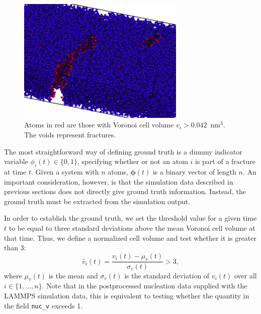     \begin{figure}
    \centering
    \noindent
    \includegraphics[width=8cm, height=6cm]{crack_vol.png}
    \caption{Atoms in red are those with Voronoi cell volume $v_i>0.042$~nm$^3$.  The voids represent fractures.}
    \label{fig:crack_vol}
    \end{figure}



The most straightforward way of defining ground truth is a dummy indicator variable $\phi_i(t) \in\{0,1\}$, specifying whether or not an atom $i$ is part of a fracture at time $t$. Given a system with $n$ atoms, $\boldsymbol{\phi}(t)$ is a binary vector of length $n$. An important consideration, however, is that the simulation data described in previous sections does not directly give ground truth information. Instead, the ground truth must be extracted from the simulation output.


    
In order to establish the ground truth, we set the threshold value for a given time $t$ to be equal to three standard deviations above the mean Voronoi cell volume at that time.  Thus, we define a normalized cell volume and test whether it is greater than 3:
    \begin{equation}
    \hat{v}_i(t) = \frac{v_i(t) - \mu_v(t)}{\sigma_v(t)} > 3,
    \end{equation}
where $\mu_v(t)$ is the mean and $\sigma_v(t)$ is the standard deviation of $v_i(t)$ over all $i\in\{1,\dots,n\}$.  Note that in the postprocessed nucleation data supplied with the LAMMPS simulation data, this is equivalent to testing whether the quantity in the field {\tt nuc\_v} exceeds 1.

